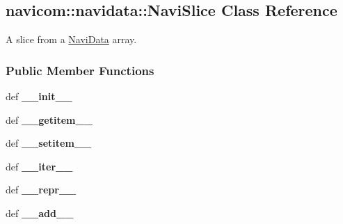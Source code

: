 \hypertarget{classnavicom_1_1navidata_1_1NaviSlice}{
\subsection{navicom::navidata::NaviSlice Class Reference}
\label{classnavicom_1_1navidata_1_1NaviSlice}
}


A slice from a \hyperlink{classnavicom_1_1navidata_1_1NaviData}{NaviData} array.  


\subsubsection*{Public Member Functions}
\begin{DoxyCompactItemize}
\item 
\hypertarget{classnavicom_1_1navidata_1_1NaviSlice_aba3318dc299ce69c4bcb60d6e0ebe05c}{
def {\bfseries \_\-\_\-init\_\-\_\-}}
\label{classnavicom_1_1navidata_1_1NaviSlice_aba3318dc299ce69c4bcb60d6e0ebe05c}

\item 
\hypertarget{classnavicom_1_1navidata_1_1NaviSlice_a05f29fe0d6c8993f0c60bf24e3157f07}{
def {\bfseries \_\-\_\-getitem\_\-\_\-}}
\label{classnavicom_1_1navidata_1_1NaviSlice_a05f29fe0d6c8993f0c60bf24e3157f07}

\item 
\hypertarget{classnavicom_1_1navidata_1_1NaviSlice_abd0f147755fd5b983fe9d6cfa1a48ce7}{
def {\bfseries \_\-\_\-setitem\_\-\_\-}}
\label{classnavicom_1_1navidata_1_1NaviSlice_abd0f147755fd5b983fe9d6cfa1a48ce7}

\item 
\hypertarget{classnavicom_1_1navidata_1_1NaviSlice_a92ec6859db93f03b62ca3a813961e531}{
def {\bfseries \_\-\_\-iter\_\-\_\-}}
\label{classnavicom_1_1navidata_1_1NaviSlice_a92ec6859db93f03b62ca3a813961e531}

\item 
\hypertarget{classnavicom_1_1navidata_1_1NaviSlice_af577af2b6a2bb0fe096ebf52b4192fda}{
def {\bfseries \_\-\_\-repr\_\-\_\-}}
\label{classnavicom_1_1navidata_1_1NaviSlice_af577af2b6a2bb0fe096ebf52b4192fda}

\item 
\hypertarget{classnavicom_1_1navidata_1_1NaviSlice_af4289e34d186bbd31c66d486cc197a8f}{
def {\bfseries \_\-\_\-add\_\-\_\-}}
\label{classnavicom_1_1navidata_1_1NaviSlice_af4289e34d186bbd31c66d486cc197a8f}

\end{DoxyCompactItemize}
